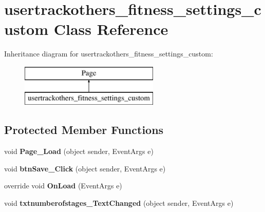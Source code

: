 \hypertarget{classusertrackothers__fitness__settings__custom}{\section{usertrackothers\-\_\-fitness\-\_\-settings\-\_\-custom Class Reference}
\label{classusertrackothers__fitness__settings__custom}
}
Inheritance diagram for usertrackothers\-\_\-fitness\-\_\-settings\-\_\-custom\-:\begin{figure}[H]
\begin{center}
\leavevmode
\includegraphics[height=2.000000cm]{classusertrackothers__fitness__settings__custom}
\end{center}
\end{figure}
\subsection*{Protected Member Functions}
\begin{DoxyCompactItemize}
\item 
\hypertarget{classusertrackothers__fitness__settings__custom_a073940e3d9aaec77d95fb710bd13845c}{void {\bfseries Page\-\_\-\-Load} (object sender, Event\-Args e)}\label{classusertrackothers__fitness__settings__custom_a073940e3d9aaec77d95fb710bd13845c}

\item 
\hypertarget{classusertrackothers__fitness__settings__custom_a789e1dbf1239d6e2d74789ef360b2b01}{void {\bfseries btn\-Save\-\_\-\-Click} (object sender, Event\-Args e)}\label{classusertrackothers__fitness__settings__custom_a789e1dbf1239d6e2d74789ef360b2b01}

\item 
\hypertarget{classusertrackothers__fitness__settings__custom_ae2b5c066deb0d07170e410f2e36b5471}{override void {\bfseries On\-Load} (Event\-Args e)}\label{classusertrackothers__fitness__settings__custom_ae2b5c066deb0d07170e410f2e36b5471}

\item 
\hypertarget{classusertrackothers__fitness__settings__custom_a02ad1e1b22e927bc20ec2520c7f68922}{void {\bfseries txtnumberofstages\-\_\-\-Text\-Changed} (object sender, Event\-Args e)}\label{classusertrackothers__fitness__settings__custom_a02ad1e1b22e927bc20ec2520c7f68922}

\end{DoxyCompactItemize}


